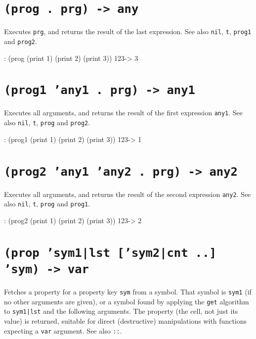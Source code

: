  
\section*{\texttt{(prog . prg) -> any}}
\label{sec:func-ref-P-(prog . prg) -> any}


Executes \texttt{prg}, and returns the result of the last expression. See also
\texttt{nil}, \texttt{t}, \texttt{prog1} and \texttt{prog2}.


\begin{wideverbatim}
: (prog (print 1) (print 2) (print 3))
123-> 3
\end{wideverbatim}

 
\section*{\texttt{(prog1 'any1 . prg) -> any1}}
\label{sec:func-ref-P-(prog1 'any1 . prg) -> any1}


Executes all arguments, and returns the result of the first expression
\texttt{any1}. See also \texttt{nil}, \texttt{t}, \texttt{prog} and \texttt{prog2}.


\begin{wideverbatim}
: (prog1 (print 1) (print 2) (print 3))
123-> 1
\end{wideverbatim}

 
\section*{\texttt{(prog2 'any1 'any2 . prg) -> any2}}
\label{sec:func-ref-P-(prog2 'any1 'any2 . prg) -> any2}


Executes all arguments, and returns the result of the second expression
\texttt{any2}. See also \texttt{nil}, \texttt{t}, \texttt{prog} and \texttt{prog1}.


\begin{wideverbatim}
: (prog2 (print 1) (print 2) (print 3))
123-> 2
\end{wideverbatim}

 
\section*{\texttt{(prop 'sym1|lst ['sym2|cnt ..] 'sym) -> var}}
\label{sec:func-ref-P-(prop 'sym1|lst ['sym2|cnt ..] 'sym) -> var}


Fetches a property for a property key \texttt{sym} from a symbol. That symbol
is \texttt{sym1} (if no other arguments are given), or a symbol found by
applying the \texttt{get} algorithm to \texttt{sym1|lst} and the following arguments.
The property (the cell, not just its value) is returned, suitable for
direct (destructive) manipulations with functions expecting a \texttt{var}
argument. See also \texttt{::}.


